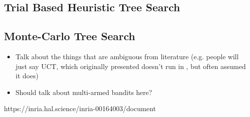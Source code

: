     \subsection{Trial Based Heuristic Tree Search}
    \label{sec:3-2-1-thts}


    \subsection{Monte-Carlo Tree Search}
    \label{sec:3-2-2-mcts}

        \begin{itemize}
            \item Talk about the things that are ambiguous from literature (e.g. people will just say UCT, which originally presented doesn't run in \mctsmode, but often assumed it does)
            \item Should talk about multi-armed bandits here?
        \end{itemize}

        https://inria.hal.science/inria-00164003/document

